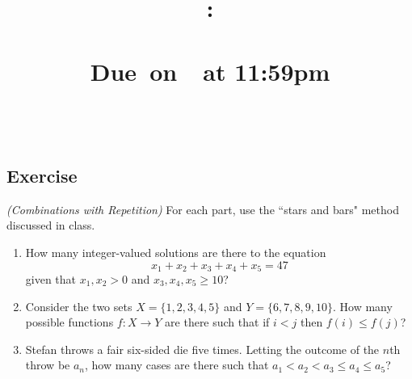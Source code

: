\documentclass{article}
\title{
    \vspace{2in}
    \textbf{\hmwkClass:\\ \hmwkTitle}\\
    \normalsize\vspace{0.1in}\small{Due\ on\ \hmwkDueDate\ at 11:59pm}\\
    \vspace{0.1in}\large{\textit{\hmwkClassInstructor\ \hmwkSection}}
    \vspace{3in}
    \author{\textbf{\hmwkAuthorName}}
    \date{}
}
\newcounter{counter}
\newcommand{\Exercise}{Exercise \stepcounter{counter}\thecounter}
\begin{document}
\maketitle
\pagebreak

\subsection*{\Exercise}
    \textit{(Combinations with Repetition) } For each part, use the ``stars and bars" method discussed in class.
    \begin{enumerate}
        \item How many integer-valued solutions are there to the equation $$x_{1} + x_{2} + x_{3} + x_{4} + x_{5} = 47$$ given that $x_{1}, x_{2} > 0$ and $x_{3}, x_{4}, x_{5} \ge 10$?
        \item Consider the two sets $X = \{1, 2, 3, 4, 5\}$ and $Y = \{6, 7, 8, 9, 10\}$. How many possible functions $f : X \rightarrow Y$ are there such that if $i < j$ then $f(i) \le f(j)$? %
        \item Stefan throws a fair six-sided die five times. Letting the outcome of the $n$th throw be $a_{n}$, how many cases are there such that $a_{1} < a_{2} < a_{3} \le a_{4} \le a_{5}$?
    \end{enumerate}
\end{document}
